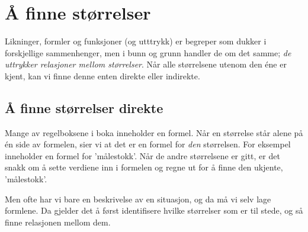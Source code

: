 



\section{Å finne størrelser}
Likninger, formler og funksjoner (og utttrykk) er begreper som dukker i forskjellige sammenhenger, men i bunn og grunn handler de om det samme; \textsl{de uttrykker relasjoner mellom størrelser}. Når alle størrelsene utenom den éne er kjent, kan vi finne denne enten direkte eller indirekte.\vsk

\subsection{Å finne størrelser direkte}
Mange av regelboksene i boka inneholder en formel. Når en størrelse står alene på én side av formelen, sier vi at det er en formel for \textsl{den} størrelsen. For eksempel inneholder  en formel for 'målestokk'. Når de andre størrelsene er gitt, er det snakk om å sette verdiene inn i formelen og regne ut for å finne den ukjente,  'målestokk'.  \vsk

Men ofte har vi bare en beskrivelse av en situasjon, og da må vi selv lage formlene. Da gjelder det å først identifisere hvilke størrelser som er til stede, og så finne relasjonen mellom dem.\regv
{}
